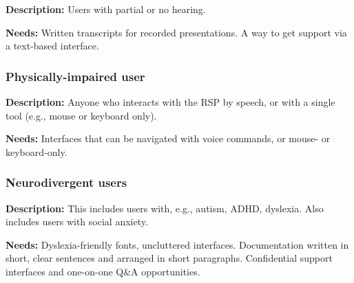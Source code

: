 \textbf{Description:}
Users with partial or no hearing.

\textbf{Needs:}
Written transcripts for recorded presentations.
A way to get support via a text-based interface. 

\subsubsection{Physically-impaired user}

\textbf{Description:}
Anyone who interacts with the RSP by speech, or with a single tool
(e.g., mouse or keyboard only).

\textbf{Needs:}
Interfaces that can be navigated with voice commands, or mouse- or keyboard-only.

\subsubsection{Neurodivergent users}

\textbf{Description:}
This includes users with, e.g., autism, ADHD, dyslexia.
Also includes users with social anxiety.

\textbf{Needs:}
Dyslexia-friendly fonts, uncluttered interfaces.
Documentation written in short, clear sentences and arranged in short paragraphs.
Confidential support interfaces and one-on-one Q\&A opportunities.
